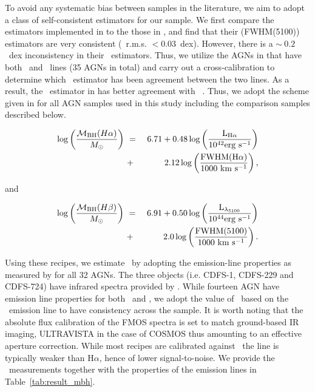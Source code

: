 \documentclass[apj]{emulateapj}
\begin{document}


To avoid any systematic bias between samples in the literature, we aim to adopt a class of self-consistent estimators for our sample. We first compare the estimators implemented in \citet{Schulze2018} to the those in \citet{Ding2017b}, and find that their \hbeta(FWHM(5100)) estimators are very consistent (\mbh\ r.m.s. $<0.03$~dex). However, there is a $\sim~0.2$~dex inconsistency in their \halpha\ estimators. Thus, we utilize the AGNs in \citet{Schulze2018} that have both \halpha\ and \hbeta\ lines (35 AGNs in total) and carry out a cross-calibration to determine which \halpha\ estimator has been agreement between the two lines. As a  result, the \halpha\ estimator in \citet{Schulze2018} has better agreement with \hbeta\  . Thus, we adopt the scheme given in \citet{Schulze2018} for all AGN samples used in this study including the comparison samples described below.

\begin{eqnarray}
\label{eq:Ha}
\log \left(\frac{\mathcal M_{\rm BH} (H\alpha)}{M_{\odot}}\right)&~=~& 6.71+0.48 \log \left(\frac{ \rm L _{H\alpha}}{10^{42}{\rm erg~s^{-1}}}\right) \nonumber\\
&~+~& 2.12 \log \left(\frac{\rm FWHM(H\alpha)}{1000 ~{\rm km~s^{-1}}}\right) ,
\end {eqnarray}

and

\begin{eqnarray}
\label{eq:Hb}
\log \left(\frac{\mathcal M_{\rm BH}(H\beta) }{M_{\odot}}\right)&~=~& 6.91+0.50\log \left(\frac{ \rm L _{\lambda_{5100}}}{10^{44}{\rm erg~s^{-1}}}\right) \nonumber\\
&~+~& 2.0 \log \left(\frac{\rm FWHM(5100)}{1000 ~{\rm km~s^{-1}}}\right) .
\end {eqnarray}

Using these recipes, we estimate \mbh\ by adopting the emission-line properties as measured by \citet{Schulze2018} for all 32 AGNs. The three objects (i.e. CDFS-1, CDFS-229 and CDFS-724) have infrared spectra provided by \citet{Suh2015}. While fourteen AGN have emission line properties for both \halpha\ and \hbeta, we adopt the value of \mbh\ based on the \halpha\ emission line to have consistency across the sample. It is worth noting that the absolute flux calibration of the FMOS spectra is set to match ground-based IR imaging, ULTRAVISTA in the case of COSMOS thus amounting to an effective aperture correction. While most recipes are calibrated against \hbeta\, the line is typically weaker than H$\alpha$, hence of lower signal-to-noise. We provide the \mbh\ measurements together with the properties of the emission lines in Table~\ref{tab:result_mbh}. 
\end{document}
